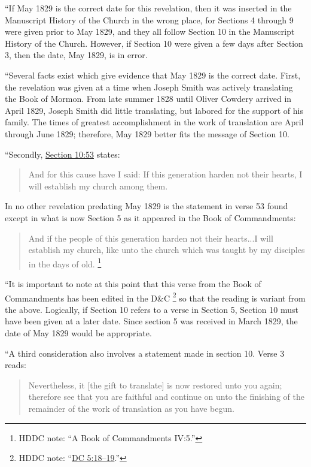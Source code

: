 			``If May 1829 is the correct date for this revelation, then it was inserted in the Manuscript History of the Church in the wrong place, for Sections 4 through 9 were given prior to May 1829, and they all follow Section 10 in the Manuscript History of the Church. However, if Section 10 were given a few days after Section 3, then the date, May 1829, is in error.
			
			``Several facts exist which give evidence that May 1829 is the correct date. First, the revelation was given at a time when Joseph Smith was actively translating the Book of Mormon. From late summer 1828 until Oliver Cowdery arrived in April 1829, Joseph Smith did little translating, but labored for the support of his family. The times of greatest accomplishment in the work of translation are April through June 1829; therefore, May 1829 better fits the message of Section 10.
			
			``Secondly, \hyperref[DC10-53]{Section 10:53} states:
			
				\begin{quote}
					And for this cause have I said: If this generation harden not their hearts, I will establish my church among them.
				\end{quote}
				
			\noindent In no other revelation predating May 1829 is the statement in verse 53 found except in what is now Section 5 as it appeared in the Book of Commandments:
			
				\begin{quote}
					And if the people of this generation harden not their hearts...I will establish my church, like unto the church which was taught by my disciples in the days of old.%
						\footnote{%
							HDDC note: ``A Book of Commandments IV:5.''
							}
				\end{quote}
				
			\noindent ``It is important to note at this point that this verse from the Book of Commandments has been edited in the D\&C%
				\footnote{%
					HDDC note: ``\hyperref[DC5-18]{DC 5:18--19}.''
					}
			so that the reading is variant from the above. Logically, if Section 10 refers to a verse in Section 5, Section 10 must have been given at a later date. Since section 5 was received in March 1829, the date of May 1829 would be appropriate.
			
			``A third consideration also involves a statement made in section 10. Verse 3 reads:
			
				\begin{quote}
					Nevertheless, it [the gift to translate] is now restored unto you again; therefore see that you are faithful and continue on unto the finishing of the remainder of the work of translation as you have begun.
				\end{quote}
				

